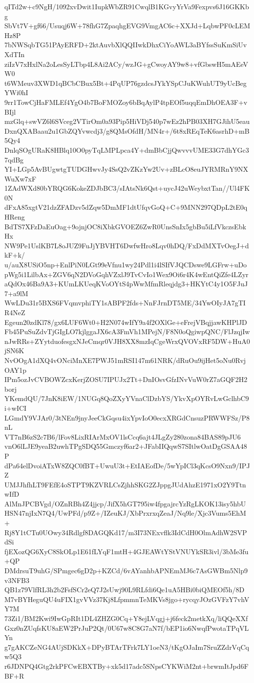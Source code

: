 qITd2w+c9NgH/1092xvDwit1IupkWbZR91CwqlB1KGvyYrVa9Fexpvs6J16GKKbg
SbVt7V+gf66/Usuqj6W+78fhG7ZpaqhgEVG9VmgAC6c+XXJd+LqbwPF0cLEMHz8P
7bNWSqbTG51PAyERFD+2ktAuvbXlQQIIwkDhxCiYoAWL3aBYfssSuKmSiUvXdTIn
ziIzV7xHxlNa2oLesSyLTbp4L8Ai2ACy/wzJG+gCwoyAY9w8+vfGbswH5mAEeVW0
t6WMeuv3XWD1qBCbCBux5Bt+4PqUP76gzdcsJYkYSpCJuKWuhUT9yUcBegYWi0hI
9rr1TowCjHaFMLEf4YgO4b7BoFMOZoy6bBqAylP4tpEOf5uqqEmDhOEA3F+vBIjl
mzGlq+swVZ6l6SVceg2VTirOm0a93Pip5HiVDj540p7wEz2hPB03XH7GJihU5eau
DxnQXABaau2u1GbZQYvwcdj3/g8QMsOfdH/MN4r+/6t8xREqTeK6asrhD+mB5Qy4
DnlqSOgURaK8HBlq10O0pyTqLMPLpca4Y+dmBbCjjQwvvvUME33G7dhYGc37qdBg
YI+LGp5AvBUgwtgTUDGHwvJy4SsQ2vZKzYw2Uv+zBLcO8euJYRMRnY9NXWuXw7xF
1ZAdWXd80bYRQG6KokeZDJbBC3/sIAtsNk6Qst+uycJ42uWeybxtTan//Ul4FK0N
dFxA85xgtV21dzZFADzv5dZqw5DmMF1dtUfqvGoQ+C+9MNN297QDpL2tE0qHReng
BdTS7XFzDaEuOag+9ojnjOC8iXbkGVOEZ6ZwR0UnsSnIx5gbBu5iLfVkczsEbkHx
NW9Pe1UslKB7L8oJUZ9FuJjYBVHT6DwfwHro8Lqv0hDQ/FxDdMXTvOegJ+dkF+k/
u/auX8USiO5np+EnlPiN0LGt99eVfnu1wy24Pdl1i4lSIfVJQCDswe9LGFrw+uDo
pWg5i1LilbAx+ZGV6qN2DVoGqhVZxlJ9TvCvIo1Wex9Oi6r4K4wEntQiZfe4LZyr
aQdOx46Ba9A3+KUmLKUeqKVoOYtS4pWwMfmRleqjdg3+HKYtC4y1O5FJuJ7+a9lM
WwLDu31r5BXS6FVqmvphiTY1sABPF2fds+NnFJrnDT5ME/34YwOIyJA7gTIR4NeZ
Egeun20zdKl78/gx6LUF6Wt0+H2N074wIfY9a4f2OXlGe+eFrejVBqjjawKHPlJD
Fb45PuSuZdvTjGIgLO7kjlggaJX6cA3FmVh1MPejN/F8N0oQgiwpQNC/FlJzqjIw
nJwRRs+ZYytduofesgxNJeCmqr0VJH8XX8mzIqCgeWrxQVOVxRF5DW+HuA0jSN6K
NvOOgA1dXQ4vONciMnXE7PWJ51mRSI147m61NRK/dRuOu9ijHet5oNu0RvjOAY1p
IPm5ozJvCVBOWZcxKerjZOSU7IPUJx2Tt+DnIOsvGfzINvVuW0rZ7aGQF2H2borj
YKemdQU/7JnK8iEW/1NUGq8QoZXyYVnaClDzbYS/YkvXpOYRvLwGclhbC9i+wICI
LGmdY9VJAr0/3tNEn9jnyJeeCkGqsu4ixYpvIoO0ecxXRGdCnsuzPRWWFSz/P8nL
VT7nB6zS2c7B6/lFov8LixRIArMxOV1lsCcq6ajt4JLgZy280zona84BAS89pJU6
vnO6lLJE9yeaB2uwhTPgSDQ55Gmczyf6ar2+JFabIIQqwS7SItlwOatDgGSAA48P
dPa64elDvoiATxW8ZQC0fBT+UwuU3t+EtIAEofDe/5wYpICl3qKcsO9Nxn9/IPJZ
UMJJhfhLT9FEfE4oSTPT9KZVRLCsZjhhSKG2ZJppgJUdAhzE1971xO2Y9TtnwIfD
AlMnJPCBVgd/OZnRBh4Z4jjcp/JifX5hGT795iw4fpgajrcYzRgLKOK13isy5hbU
HSN47njIxN7Q4/UwPFd/p9Z+/IZeuKJ/XbPrxrxqZeaJ/Nq9le/Xjc3Vums5EhM+
Rj8Y1tCTu0UOwy34Rdlgf8DAGQKd17/m3I73NExvflk3IdCdH0OlmAdhW2SVPdSi
fjEXozQG6XyC8SkOLp1E61fLYqF1mtH+4GJEAWtYStVNUYkSR3ivl/3bMe3fu+QP
DMdrsuT9uhG/SPmgec6gD2p+KZCd/6vAYanhbAPNEmMJ6c7AsGWBm5Nlp9v3NFB3
QB1z79VlfRL3h2b2FsfSCr2eQ7J2sUwj90L9RLfdi6Qe1uA5HBi0biQMEOf5h/8D
M7vBYHeguQU4uFIX1gvVVz37Kj8LfpmmnTeMKVs8jgo+rycqyJOzGVFzY7vhVY7M
73Zi1/BM2Kwi9IwGpRIt1DL4ZHZG0Cq+Y8ejLVqgj+j6feck2metkXq/liQQeXXf
Gxz0nZUqfsKU8aEW2PrJuP2Qt/0U67w8C8G7aN7f/bEP1io6NwqfPwotaTPqVLYn
g7gAKCZeNG4AUjSDKkX+DPyBTArTFrk7LY1oeN3/tKgOJaIm7SruZZdrVqCqw5Q3
r6JDNPQ4Gtg2rkPFCwEBXTBy+xk5d17adc5SNpsCYKWiM2nt+brwmItJpd6FBF+R

